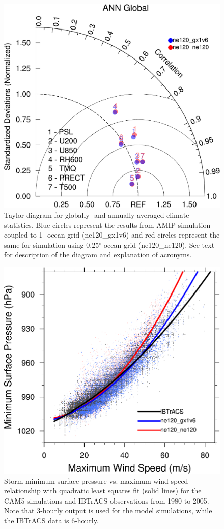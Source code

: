 \documentclass[draft,ms]{AGUTeX}
\newcommand{\degree}{$^{\circ}$}
\begin{document}
\begin{figure}
\includegraphics[width=0.7\linewidth]{fig_taylor_globe_ANN.pdf}
\caption{Taylor diagram for globally- and annually-averaged climate statistics. Blue circles represent the results from AMIP simulation coupled to 1\degree{} ocean grid (ne120\_gx1v6) and red circles represent the same for simulation using 0.25\degree{} ocean grid (ne120\_ne120). See text for description of the diagram and explanation of acronyms.}
\label{fig:taylor_global}
\end{figure}

\begin{figure}
\includegraphics[width=0.8\linewidth]{fig_preswind.pdf}
\caption{Storm minimum surface pressure vs. maximum wind speed relationship with quadratic least squares fit (solid lines) for the CAM5 simulations and IBTrACS observations from 1980 to 2005. Note that 3-hourly output is used for the model simulations, while the IBTrACS data is 6-hourly.}
\label{fig:preswind}
\end{figure}
\end{document}
